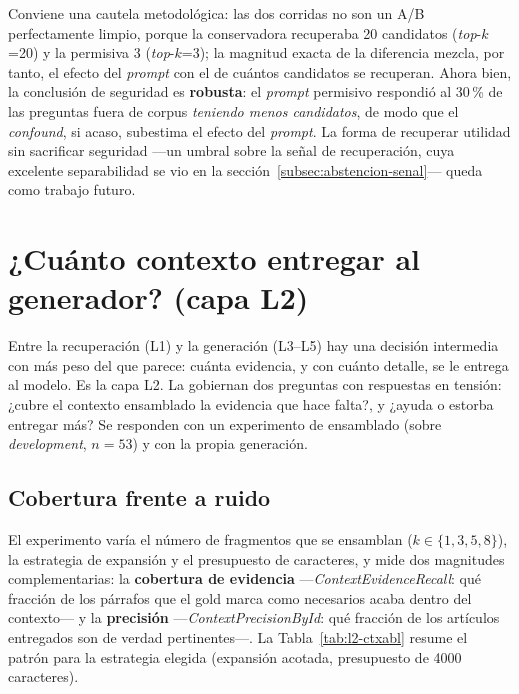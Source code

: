 Conviene una cautela metodológica: las dos corridas no son un A/B perfectamente limpio, porque la conservadora recuperaba 20 candidatos (\emph{top}-$k$=20) y la permisiva 3 (\emph{top}-$k$=3); la magnitud exacta de la diferencia mezcla, por tanto, el efecto del \emph{prompt} con el de cuántos candidatos se recuperan. Ahora bien, la conclusión de seguridad es \textbf{robusta}: el \emph{prompt} permisivo respondió al 30\,\% de las preguntas fuera de corpus \emph{teniendo menos candidatos}, de modo que el \emph{confound}, si acaso, subestima el efecto del \emph{prompt}. La forma de recuperar utilidad sin sacrificar seguridad —un umbral sobre la señal de recuperación, cuya excelente separabilidad se vio en la sección~\ref{subsec:abstencion-senal}— queda como trabajo futuro.

\section{¿Cuánto contexto entregar al generador? (capa L2)}
\label{sec:eval-contexto}

Entre la recuperación (L1) y la generación (L3--L5) hay una decisión intermedia con más peso del que parece: cuánta evidencia, y con cuánto detalle, se le entrega al modelo. Es la capa L2. La gobiernan dos preguntas con respuestas en tensión: ¿cubre el contexto ensamblado la evidencia que hace falta?, y ¿ayuda o estorba entregar más? Se responden con un experimento de ensamblado (sobre \emph{development}, $n=53$) y con la propia generación.

\subsection{Cobertura frente a ruido}
\label{subsec:l2-cobertura}

El experimento varía el número de fragmentos que se ensamblan ($k \in \{1,3,5,8\}$), la estrategia de expansión y el presupuesto de caracteres, y mide dos magnitudes complementarias: la \textbf{cobertura de evidencia} —\emph{ContextEvidenceRecall}: qué fracción de los párrafos que el gold marca como necesarios acaba dentro del contexto— y la \textbf{precisión} —\emph{ContextPrecisionById}: qué fracción de los artículos entregados son de verdad pertinentes—. La Tabla~\ref{tab:l2-ctxabl} resume el patrón para la estrategia elegida (expansión acotada, presupuesto de 4000 caracteres).

